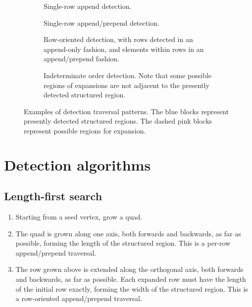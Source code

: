 \begin{figure}
\begin{subfigure}[t]{0.45\textwidth}
	\centering
	
	\caption{Single-row append detection.}
\end{subfigure}
\begin{subfigure}[t]{0.45\textwidth}
	\centering
	
	\caption{Single-row append/prepend detection.}
\end{subfigure}
\begin{subfigure}[b]{0.45\textwidth}
	\centering
	
	\vspace{4.5mm}
	\caption{Row-oriented detection, with rows detected in an append-only fashion, and elements within rows in an append/prepend fashion.}
\end{subfigure}
\begin{subfigure}[b]{0.45\textwidth}
	\centering
	
	\caption{Indeterminate order detection. Note that some possible regions of expansions are not adjacent to the presently detected structured region.}
\end{subfigure}

\caption{Examples of detection traversal patterns. The blue blocks represent presently detected structured regions. The dashed pink blocks represent possible regions for expansion.\label{fig:detection-traversal-patterns}}
\end{figure}



\section{Detection algorithms}

\subsection{Length-first search}
\label{subsec:length-first-search}

\begin{enumerate}
\item Starting from a seed vertex, grow a quad.

\item The quad is grown along one axis, both forwards and backwards, as far as possible, forming the length of the structured region. This is a per-row append/prepend traversal.
\item \label{step:row-expansion} The row grown above is extended along the orthogonal axis, both forwards and backwards, as far as possible. Each expanded row must have the length of the initial row exactly, forming the width of the structured region. This is a row-oriented append/prepend traversal.
\end{enumerate}

